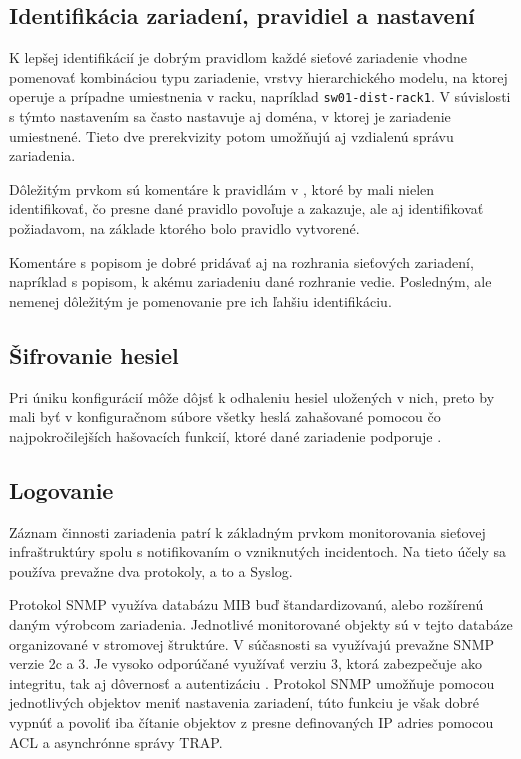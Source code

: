 \subsection*{Identifikácia zariadení, pravidiel a nastavení}
K lepšej identifikácií je dobrým pravidlom každé sieťové zariadenie vhodne pomenovať kombináciou typu zariadenie, vrstvy hierarchického modelu, na ktorej operuje a prípadne umiestnenia v racku, napríklad \texttt{sw01-dist-rack1}. V súvislosti s týmto nastavením sa často nastavuje aj doména, v ktorej je zariadenie umiestnené. Tieto dve prerekvizity potom umožňujú aj vzdialenú správu zariadenia.

Dôležitým prvkom sú komentáre k pravidlám v , ktoré by mali nielen identifikovať, čo presne dané pravidlo povoľuje a zakazuje, ale aj identifikovať požiadavom, na základe ktorého bolo pravidlo vytvorené. 

Komentáre s popisom je dobré pridávať aj na rozhrania sieťových zariadení, napríklad s popisom, k akému zariadeniu dané rozhranie vedie. Posledným, ale nemenej dôležitým je pomenovanie  pre ich ľahšiu identifikáciu.

\subsection*{Šifrovanie hesiel}
Pri úniku konfigurácií môže dôjsť k odhaleniu hesiel uložených v nich, preto by mali byť v konfiguračnom súbore všetky heslá zahašované pomocou čo najpokročilejších hašovacích funkcií, ktoré dané zariadenie podporuje \cite{CIS_DrTLsgXv24lxeIIM}.

\subsection*{Logovanie}
Záznam činnosti zariadenia patrí k základným prvkom monitorovania sieťovej infraštruktúry spolu s notifikovaním o vzniknutých incidentoch. Na tieto účely sa používa prevažne dva protokoly, a to  a Syslog. 

Protokol SNMP využíva databázu MIB buď štandardizovanú, alebo rozšírenú daným výrobcom zariadenia. Jednotlivé monitorované objekty sú v tejto databáze organizované v stromovej štruktúre. V súčasnosti sa využívajú prevažne SNMP verzie 2c a 3. Je vysoko odporúčané využívať verziu 3, ktorá zabezpečuje ako integritu, tak aj dôvernosť a autentizáciu \cite{CIS_DrTLsgXv24lxeIIM} \cite{Graesser2001}. Protokol SNMP umožňuje pomocou jednotlivých objektov meniť nastavenia zariadení, túto funkciu je však dobré vypnúť a povoliť iba čítanie objektov z presne definovaných IP adries pomocou ACL a asynchrónne správy TRAP.   

